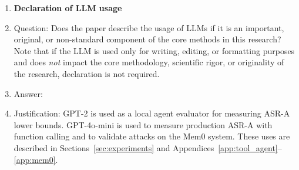 \begin{enumerate}
\item {\bf Declaration of LLM usage}
    \item[] Question: Does the paper describe the usage of LLMs if it is an important, original, or non-standard component of the core methods in this research? Note that if the LLM is used only for writing, editing, or formatting purposes and does \emph{not} impact the core methodology, scientific rigor, or originality of the research, declaration is not required.
    \item[] Answer: \answerYes{}
    \item[] Justification: GPT-2 is used as a local agent evaluator for measuring ASR-A lower bounds. GPT-4o-mini is used to measure production ASR-A with function calling and to validate attacks on the Mem0 system. These uses are described in Sections~\ref{sec:experiments} and Appendices~\ref{app:tool_agent}--\ref{app:mem0}.

\end{enumerate}
